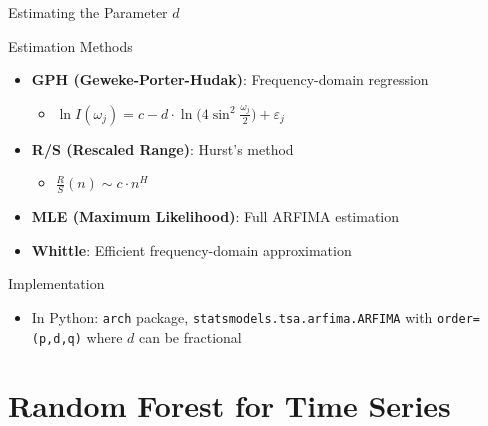 \documentclass[9pt, aspectratio=169, t]{beamer}
\begin{document}
\begin{frame}{Estimating the Parameter $d$}
    \vspace{-0.2cm}
    {\footnotesize
    \begin{block}{Estimation Methods}
        \begin{itemize}\setlength{\itemsep}{0pt}
            \item \textbf{GPH (Geweke-Porter-Hudak)}: Frequency-domain regression
            \begin{itemize}\setlength{\itemsep}{0pt}
                \item $\ln I(\omega_j) = c - d \cdot \ln\bigl(4\sin^2\frac{\omega_j}{2}\bigr) + \varepsilon_j$
            \end{itemize}
            \item \textbf{R/S (Rescaled Range)}: Hurst's method
            \begin{itemize}\setlength{\itemsep}{0pt}
                \item $\frac{R}{S}(n) \sim c \cdot n^H$
            \end{itemize}
            \item \textbf{MLE (Maximum Likelihood)}: Full ARFIMA estimation
            \item \textbf{Whittle}: Efficient frequency-domain approximation
        \end{itemize}
    \end{block}

    \vspace{0.2cm}

    {\footnotesize
    \begin{exampleblock}{Implementation}
        \begin{itemize}\setlength{\itemsep}{0pt}
            \item In Python: \texttt{arch} package, \texttt{statsmodels.tsa.arfima.ARFIMA} with \texttt{order=(p,d,q)} where $d$ can be fractional
        \end{itemize}
    \end{exampleblock}
    }
    }
\end{frame}


\section{Random Forest for Time Series}
\end{document}
